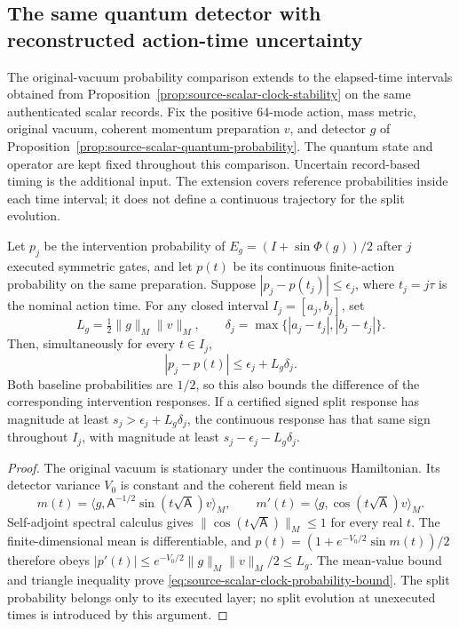 \subsection{The same quantum detector with reconstructed action-time uncertainty}
\label{sec:source-scalar-clock-quantum}

The original-vacuum probability comparison extends to the elapsed-time
intervals obtained from Proposition~\ref{prop:source-scalar-clock-stability}
on the same authenticated scalar records. Fix the
positive $64$-mode action, mass metric, original vacuum, coherent momentum
preparation $v$, and detector $g$ of
Proposition~\ref{prop:source-scalar-quantum-probability}.
The quantum state and operator are kept fixed throughout this comparison.
Uncertain record-based timing is the additional input.
The extension covers reference probabilities inside each time interval;
it does not define a continuous trajectory for the split evolution.

\begin{proposition}
\label{prop:source-scalar-clock-probability}
Let $p_j$ be the intervention probability of
$E_g=(I+\sin\Phi(g))/2$ after $j$ executed symmetric gates, and let $p(t)$
be its continuous finite-action probability on the same preparation.
Suppose $|p_j-p(t_j)|\le\epsilon_j$, where $t_j=j\tau$ is the nominal
action time. For any closed interval $I_j=[a_j,b_j]$, set
\[
 L_g=\tfrac12\|g\|_M\|v\|_M,\qquad
 \delta_j=\max\{|a_j-t_j|,|b_j-t_j|\}.
\]
Then, simultaneously for every $t\in I_j$,
\begin{equation}
 |p_j-p(t)|\le \epsilon_j+L_g\delta_j.
 \label{eq:source-scalar-clock-probability-bound}
\end{equation}
Both baseline probabilities are $1/2$, so this also bounds the difference
of the corresponding intervention responses. If a certified signed split
response has magnitude at least $s_j>\epsilon_j+L_g\delta_j$, the
continuous response has that same sign throughout $I_j$, with magnitude
at least $s_j-\epsilon_j-L_g\delta_j$.
\end{proposition}
\begin{proof}
The original vacuum is stationary under the continuous Hamiltonian.
Its detector variance $V_0$ is constant and the coherent field mean is
\[
 m(t)=\langle g,\mathsf A^{-1/2}\sin(t\sqrt{\mathsf A})v\rangle_M,
 \qquad
 m'(t)=\langle g,\cos(t\sqrt{\mathsf A})v\rangle_M.
\]
Self-adjoint spectral calculus gives
$\|\cos(t\sqrt{\mathsf A})\|_M\le1$ for every real $t$.
The finite-dimensional mean is differentiable, and
$p(t)=(1+e^{-V_0/2}\sin m(t))/2$ therefore obeys
$|p'(t)|\le e^{-V_0/2}\|g\|_M\|v\|_M/2\le L_g$.
The mean-value bound and triangle inequality prove
\eqref{eq:source-scalar-clock-probability-bound}.
The split probability belongs only to its executed layer; no split
evolution at unexecuted times is introduced by this argument.
\end{proof}

